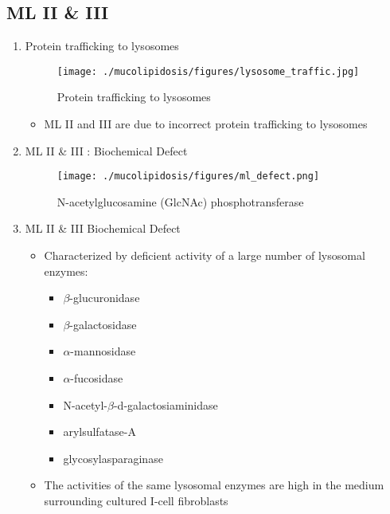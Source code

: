 \documentclass{scrartcl}
\begin{document}
\subsection{ML II \& III}
\label{sec:org341d871}
\begin{enumerate}
\item Protein trafficking to lysosomes
\label{sec:org9a6786e}

\begin{figure}[htbp]
\centering
\texttt{[image: ./mucolipidosis/figures/lysosome\_traffic.jpg]}
\caption[Protein trafficking to lysosomes]{\label{fig:org35337ec}
Protein trafficking to lysosomes}
\end{figure}

\begin{itemize}
\item ML II and III are due to incorrect protein trafficking to lysosomes
\end{itemize}

\item ML II \& III : Biochemical Defect
\label{sec:org3578f5e}

\begin{figure}[htbp]
\centering
\texttt{[image: ./mucolipidosis/figures/ml\_defect.png]}
\caption[N-acetylglucosamine (GlcNAc) phosphotransferase]{\label{fig:org26d3d15}
N-acetylglucosamine (GlcNAc) phosphotransferase}
\end{figure}

\item ML II \& III Biochemical Defect
\label{sec:org7fa6b66}
\begin{itemize}
\item Characterized by deficient activity of a large number of lysosomal enzymes:
\begin{itemize}
\item \(\beta\)-glucuronidase
\item \(\beta\)-galactosidase
\item \(\alpha\)-mannosidase
\item \(\alpha\)-fucosidase
\item N-acetyl-\(\beta\)-d-galactosiaminidase
\item arylsulfatase-A
\item glycosylasparaginase
\end{itemize}
\item The activities of the same lysosomal enzymes are high in the medium
surrounding cultured I-cell fibroblasts
\end{itemize}



\end{enumerate}
\end{document}
